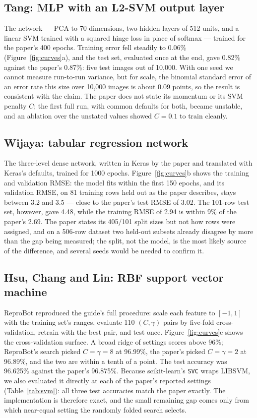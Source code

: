 \documentclass[11pt]{article}
\begin{document}
\subsection{Tang: MLP with an L2-SVM output layer}

The network --- PCA to 70 dimensions, two hidden layers of 512 units, and a linear SVM trained
with a squared hinge loss in place of softmax --- trained for the paper's 400 epochs. Training
error fell steadily to 0.06\% (Figure~\ref{fig:curves}a), and the test set, evaluated once at
the end, gave 0.82\% against the paper's 0.87\%: five test images out of 10{,}000. With one seed
we cannot measure run-to-run variance, but for scale, the binomial standard error of an error
rate this size over 10{,}000 images is about 0.09 points, so the result is consistent with the
claim. The paper does not state its momentum or its SVM penalty $C$; the first full run, with
common defaults for both, became unstable, and an ablation over the unstated values showed
$C = 0.1$ to train cleanly.

\subsection{Wijaya: tabular regression network}

The three-level dense network, written in Keras by the paper and translated with Keras's
defaults, trained for 1000 epochs. Figure~\ref{fig:curves}b shows the training and validation
RMSE: the model fits within the first 150 epochs, and its validation RMSE, on 81 training rows
held out as the paper describes, stays between 3.2 and 3.5 --- close to the paper's test RMSE
of 3.02. The 101-row test set, however, gave 4.48, while the training RMSE of 2.94 is within 9\%
of the paper's 2.69. The paper states its 405/101 split sizes but not how rows were assigned, and
on a 506-row dataset two held-out subsets already disagree by more than the gap being measured;
the split, not the model, is the most likely source of the difference, and several seeds would
be needed to confirm it.

\subsection{Hsu, Chang and Lin: RBF support vector machine}

ReproBot reproduced the guide's full procedure: scale each feature to $[-1, 1]$ with the
training set's ranges, evaluate 110 $(C, \gamma)$ pairs by five-fold cross-validation, retrain
with the best pair, and test once. Figure~\ref{fig:curves}c shows the cross-validation surface.
A broad ridge of settings scores above 96\%; ReproBot's search picked $C = \gamma = 8$ at
96.99\%, the paper's picked $C = \gamma = 2$ at 96.89\%, and the two are within a tenth of a
point. The test accuracy was 96.625\% against the paper's 96.875\%. Because scikit-learn's
\texttt{SVC} wraps LIBSVM, we also evaluated it directly at each of the paper's reported
settings (Table~\ref{tab:svm}): all three test accuracies match the paper exactly. The
implementation is therefore exact, and the small remaining gap comes only from which near-equal
setting the randomly folded search selects.
\end{document}
